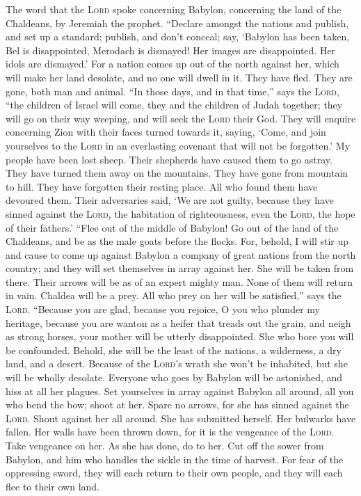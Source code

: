  The word that the \textsc{Lord} spoke concerning Babylon,
concerning the land of the Chaldeans, by Jeremiah the prophet.
 ``Declare amongst the nations and publish, and set up a
standard; publish, and don't conceal; say, `Babylon has been taken, Bel
is disappointed, Merodach is dismayed! Her images are disappointed. Her
idols are dismayed.'  For a nation comes up out of the
north against her, which will make her land desolate, and no one will
dwell in it. They have fled. They are gone, both man and animal.
 ``In those days, and in that time,'' says the
\textsc{Lord}, ``the children of Israel will come, they and the children
of Judah together; they will go on their way weeping, and will seek the
\textsc{Lord} their God.  They will enquire concerning
Zion with their faces turned towards it, saying, `Come, and join
yourselves to the \textsc{Lord} in an everlasting covenant that will not
be forgotten.'  My people have been lost sheep. Their
shepherds have caused them to go astray. They have turned them away on
the mountains. They have gone from mountain to hill. They have forgotten
their resting place.  All who found them have devoured
them. Their adversaries said, `We are not guilty, because they have
sinned against the \textsc{Lord}, the habitation of righteousness, even
the \textsc{Lord}, the hope of their fathers.'  ``Flee out
of the middle of Babylon! Go out of the land of the Chaldeans, and be as
the male goats before the flocks.  For, behold, I will
stir up and cause to come up against Babylon a company of great nations
from the north country; and they will set themselves in array against
her. She will be taken from there. Their arrows will be as of an expert
mighty man. None of them will return in vain.  Chaldea
will be a prey. All who prey on her will be satisfied,'' says the
\textsc{Lord}.  ``Because you are glad, because you
rejoice, O you who plunder my heritage, because you are wanton as a
heifer that treads out the grain, and neigh as strong horses,
 your mother will be utterly disappointed. She who bore
you will be confounded. Behold, she will be the least of the nations, a
wilderness, a dry land, and a desert.  Because of the
\textsc{Lord}'s wrath she won't be inhabited, but she will be wholly
desolate. Everyone who goes by Babylon will be astonished, and hiss at
all her plagues.  Set yourselves in array against Babylon
all around, all you who bend the bow; shoot at her. Spare no arrows, for
she has sinned against the \textsc{Lord}.  Shout against
her all around. She has submitted herself. Her bulwarks have fallen. Her
walls have been thrown down, for it is the vengeance of the
\textsc{Lord}. Take vengeance on her. As she has done, do to her.
 Cut off the sower from Babylon, and him who handles the
sickle in the time of harvest. For fear of the oppressing sword, they
will each return to their own people, and they will each flee to their
own land.

